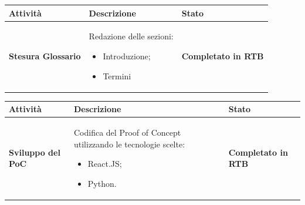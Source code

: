\documentclass[a4paper,12pt]{article}
\begin{document}
        {\renewcommand{\arraystretch}{1.4}
            \begin{table}[H]
            \centering
            \begin{tabularx}{\textwidth}{|X|X|X|}
                \hline
                \rowcolor{gold}
		    \textbf{Attività} & \textbf{Descrizione} & \textbf{Stato}\\
                \hline
		      \textbf{Stesura Glossario} & Redazione delle sezioni:
		    \begin{itemize}
			    \item Introduzione;
			    \item Termini
		    \end{itemize}		    & \textbf{Completato in RTB} \\
                \hline
              \end{tabularx}      
            \end{table}
        }

        {\renewcommand{\arraystretch}{1.4}
            \begin{table}[H]
            \centering
            \begin{tabularx}{\textwidth}{|X|X|X|}
                \hline
                \rowcolor{gold}
		    \textbf{Attività} & \textbf{Descrizione} & \textbf{Stato}\\
                \hline
		      \textbf{Sviluppo del PoC} & Codifica del Proof of Concept utilizzando le tecnologie scelte:
		    \begin{itemize}
			    \item React.JS;
			    \item Python.
		    \end{itemize}		    & \textbf{Completato in RTB} \\
                \hline
              \end{tabularx}      
            \end{table}
        }
\end{document}
